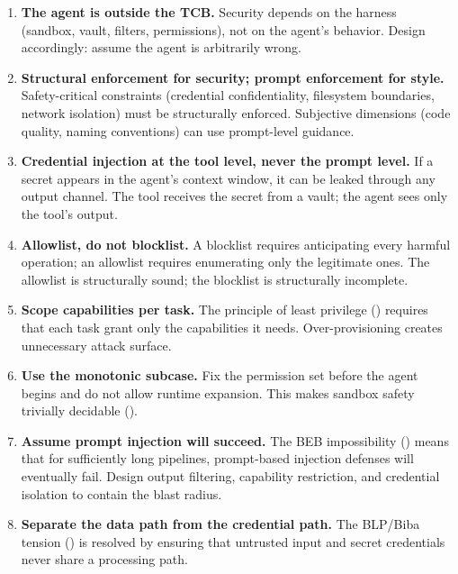 \documentclass[11pt, a4paper, copyright]{googledeepmind}
\begin{document}
\begin{enumerate}
    \item \textbf{The agent is outside the TCB.} Security depends on the harness (sandbox, vault, filters, permissions), not on the agent's behavior. Design accordingly: assume the agent is arbitrarily wrong.

    \item \textbf{Structural enforcement for security; prompt enforcement for style.} Safety-critical constraints (credential confidentiality, filesystem boundaries, network isolation) must be structurally enforced. Subjective dimensions (code quality, naming conventions) can use prompt-level guidance.

    \item \textbf{Credential injection at the tool level, never the prompt level.} If a secret appears in the agent's context window, it can be leaked through any output channel. The tool receives the secret from a vault; the agent sees only the tool's output.

    \item \textbf{Allowlist, do not blocklist.} A blocklist requires anticipating every harmful operation; an allowlist requires enumerating only the legitimate ones. The allowlist is structurally sound; the blocklist is structurally incomplete.

    \item \textbf{Scope capabilities per task.} The principle of least privilege () requires that each task grant only the capabilities it needs. Over-provisioning creates unnecessary attack surface.

    \item \textbf{Use the monotonic subcase.} Fix the permission set before the agent begins and do not allow runtime expansion. This makes sandbox safety trivially decidable ().

    \item \textbf{Assume prompt injection will succeed.} The BEB impossibility () means that for sufficiently long pipelines, prompt-based injection defenses will eventually fail. Design output filtering, capability restriction, and credential isolation to contain the blast radius.

    \item \textbf{Separate the data path from the credential path.} The BLP/Biba tension () is resolved by ensuring that untrusted input and secret credentials never share a processing path.


\end{enumerate}
\end{document}
